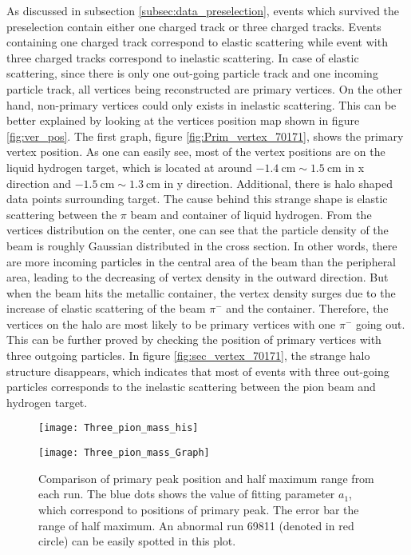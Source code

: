 As discussed in subsection \ref{subsec:data_preselection}, events which survived the  preselection contain either one charged track or three charged tracks. Events containing one charged track correspond to elastic scattering while event with three charged tracks correspond to inelastic scattering. In case of elastic scattering, since there is only one out-going particle track and one incoming particle track, all vertices being reconstructed are primary vertices. On the other hand, non-primary vertices could only exists in inelastic scattering. This can be better explained by looking at the vertices position map shown in figure \ref{fig:ver_pos}. The first graph, figure \ref{fig:Prim_vertex_70171}, shows the primary vertex position. As one can easily see, most of the vertex positions are on the liquid hydrogen target, which is located at around $\SI{-1.4}{\centi\meter} \sim \SI{1.5}{\centi\meter}$ in x direction and $\SI{-1.5}{\centi\meter} \sim \SI{1.3}{\centi\meter}$ in y direction. Additional, there is halo shaped data points surrounding target. The cause behind this strange shape is elastic scattering between the $\pi$ beam and container of liquid hydrogen. From the vertices distribution on the center, one can see that the particle density of the beam is roughly Gaussian distributed in the cross section. In other words, there are more incoming particles in the central area of the beam than the peripheral area, leading to the decreasing of vertex density in the outward direction. But when the beam hits the metallic container, the vertex density surges due to the increase of elastic scattering of the beam $\pi^-$ and the container. Therefore, the vertices on the halo are most likely to be primary vertices with one $\pi^-$ going out. This can be further proved by checking the position of primary vertices with three outgoing particles. In figure \ref{fig:sec_vertex_70171}, the strange halo structure disappears, which indicates that most of events with three out-going particles corresponds to the inelastic scattering between the pion beam and hydrogen target.  
\begin{figure*}[!ht]
	\centering
	\vspace{1cm}
	\texttt{[image: Three\_pion\_mass\_his]}
	\caption{Histogram of the three pion invariant mass for each run. The colors inside the histogram represent the number of events for each run and invariant mass. To better compare and conceive the structure of the distribution between runs visually, the maximal value of each distribution is normalized to 1000. As one can easily notice that maximal value or peak of distribution locates around \SI{1.3}{\giga\electronvolt} for almost every run.}
	\label{fig:Three_pion_mass_his}
	\vspace{2 cm}
	
	\texttt{[image: Three\_pion\_mass\_Graph]}
	\caption{Comparison of primary peak position and half maximum range from each run. The blue dots shows the value of fitting parameter $a_1$, which correspond to positions of primary peak. The error bar the range of half maximum. An abnormal run 69811 (denoted in red circle) can be easily spotted in this plot.}
	\label{fig:Three_pion_mass_Graph}
	\vspace{3cm}
\end{figure*}
